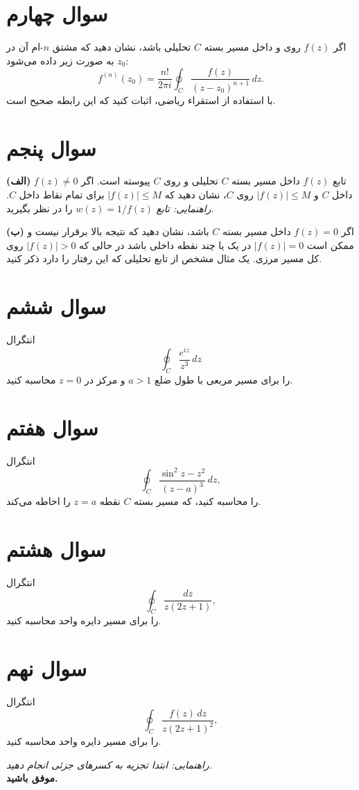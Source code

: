 \documentclass[a4paper,16pt]{article}
\begin{document}
	\section{سوال چهارم}

اگر \(f(z)\) روی و داخل مسیر بسته \(C\) تحلیلی باشد، نشان دهید که مشتق \(n\)-ام آن در \(z_0\) به صورت زیر داده می‌شود:  
\[
f^{(n)}(z_0) = \frac{n!}{2\pi i} \oint_C \frac{f(z)}{(z-z_0)^{n+1}}\, dz.
\]  
با استفاده از استقراء ریاضی، اثبات کنید که این رابطه صحیح است.

	
	\section{سوال پنجم}

\textbf{(الف)} تابع \(f(z)\) داخل مسیر بسته \(C\) تحلیلی و روی \(C\) پیوسته است. اگر \(f(z) \neq 0\) داخل \(C\) و \(|f(z)| \le M\) روی \(C\)، نشان دهید که \(|f(z)| \le M\) برای تمام نقاط داخل \(C\).  
\textit{راهنمایی: تابع } \(w(z) = 1/f(z)\) را در نظر بگیرید.

\textbf{(ب)}  
اگر \(f(z) = 0\) داخل مسیر بسته \(C\) باشد، نشان دهید که نتیجه بالا برقرار نیست و ممکن است \(|f(z)| = 0\) در یک یا چند نقطه داخلی باشد در حالی که \(|f(z)| > 0\) روی کل مسیر مرزی. یک مثال مشخص از تابع تحلیلی که این رفتار را دارد ذکر کنید.

	
	\section{سوال ششم}
	انتگرال
	\[
	\oint_C \frac{e^{i z}}{z^3}\, dz
	\]  
	را برای مسیر مربعی با طول ضلع \(a > 1\) و مرکز در \(z = 0\) محاسبه کنید.
	
	\section{سوال هفتم}
	انتگرال
	\[
	\oint_C \frac{\sin^2 z - z^2}{(z - a)^3}\, dz,
	\]  
	را محاسبه کنید، که مسیر بسته \(C\) نقطه \(z = a\) را احاطه می‌کند.
	
	\section{سوال هشتم}
	انتگرال
	\[
	\oint_C \frac{dz}{z(2z+1)},
	\]  
	را برای مسیر دایره واحد محاسبه کنید.
	\section{سوال نهم}
	انتگرال
	\[
	\oint_C \frac{f(z)\, dz}{z(2z+1)^2},
	\]  
	را برای مسیر دایره واحد محاسبه کنید.  
	
	\textit{راهنمایی: ابتدا تجزیه به کسرهای جزئی انجام دهید.}
	\\
	\textbf{موفق باشید.}
\end{document}
